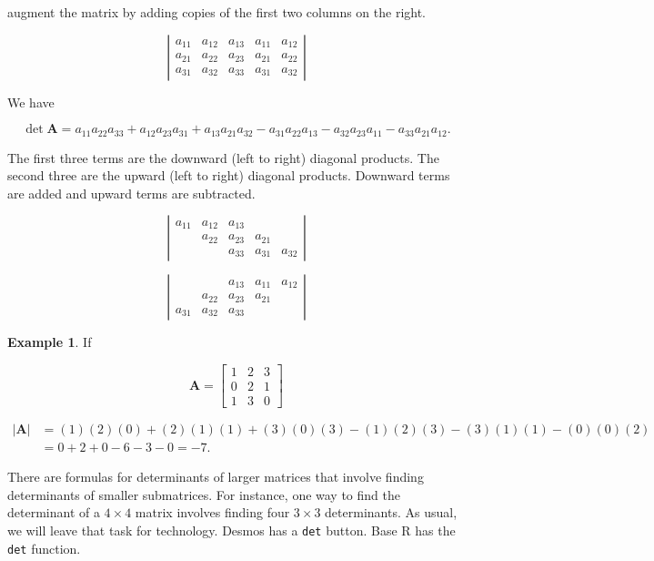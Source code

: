 \documentclass[
]{book}
\theoremstyle{definition}
\theoremstyle{definition}
\newtheorem{example}{Example}[chapter]
\theoremstyle{definition}
\theoremstyle{definition}
\theoremstyle{remark}
\begin{document}
augment the matrix by adding copies of the first two columns on the right.

\[\left|\begin{array}{rrr|rr}
a_{11}&a_{12}&a_{13}&a_{11}&a_{12}\\a_{21}&a_{22}&a_{23}&a_{21}&a_{22}\\a_{31}&a_{32}&a_{33}&a_{31}&a_{32}
\end{array}\right|\]

We have

\[\det\mathbf{A}=a_{11}a_{22}a_{33}+a_{12}a_{23}a_{31}+a_{13}a_{21}a_{32}-a_{31}a_{22}a_{13}-a_{32}a_{23}a_{11}-a_{33}a_{21}a_{12}.\]

The first three terms are the downward (left to right) diagonal products. The second three are the upward (left to right) diagonal products. Downward terms are added and upward terms are subtracted.

\[\left|\begin{array}{rrr|rr}
a_{11}&a_{12}&a_{13}&&\\&a_{22}&a_{23}&a_{21}&\\&&a_{33}&a_{31}&a_{32}
\end{array}\right|\]

\[\left|\begin{array}{rrr|rr}
&&a_{13}&a_{11}&a_{12}\\&a_{22}&a_{23}&a_{21}&\\a_{31}&a_{32}&a_{33}&&
\end{array}\right|\]

\begin{examplebox}

\begin{example}
If

\[\mathbf{A}=\begin{bmatrix} 1 & 2 & 3\\0 & 2 & 1\\1 & 3 & 0    \end{bmatrix}\]

\begin{align*} 
|\mathbf{A}|&=(1)(2)(0)+(2)(1)(1)+(3)(0)(3)-(1)(2)(3)-(3)(1)(1)-(0)(0)(2)\\
&=0+2+0-6-3-0=-7.
\end{align*}
\end{example}

\end{examplebox}

There are formulas for determinants of larger matrices that involve finding determinants of smaller submatrices. For instance, one way to find the determinant of a \(4\times 4\) matrix involves finding four \(3\times 3\) determinants. As usual, we will leave that task for technology. Desmos has a \texttt{det} button. Base R has the \texttt{det} function.
\end{document}
